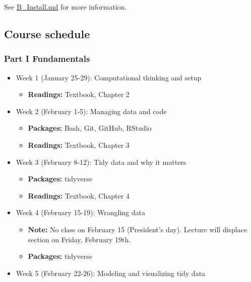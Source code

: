 \documentclass[
]{article}
\providecommand{\tightlist}{%
  \setlength{\itemsep}{0pt}\setlength{\parskip}{0pt}}
\begin{document}
See
\href{https://github.com/jaeyk/PS239T/blob/master/B_Install.md}{B\_Install.md}
for more information.

\hypertarget{course-schedule}{%
\subsection{Course schedule}\label{course-schedule}}

\hypertarget{part-i-fundamentals-1}{%
\subsubsection{Part I Fundamentals}\label{part-i-fundamentals-1}}

\begin{itemize}
\tightlist
\item
  Week 1 (January 25-29): Computational thinking and setup

  \begin{itemize}
  \tightlist
  \item
    \textbf{Readings:} Textbook, Chapter 2
  \end{itemize}
\item
  Week 2 (February 1-5): Managing data and code

  \begin{itemize}
  \tightlist
  \item
    \textbf{Packages:} Bash, Git, GitHub, RStudio
  \item
    \textbf{Readings:} Textbook, Chapter 3
  \end{itemize}
\item
  Week 3 (February 8-12): Tidy data and why it matters

  \begin{itemize}
  \tightlist
  \item
    \textbf{Packages:} tidyverse
  \item
    \textbf{Readings:} Textbook, Chapter 4
  \end{itemize}
\item
  Week 4 (February 15-19): Wrangling data

  \begin{itemize}
  \tightlist
  \item
    \textbf{Note:} No class on February 15 (President's day). Lecture
    will displace section on Friday, February 19th.
  \item
    \textbf{Packages:} tidyverse
  \end{itemize}
\item
  Week 5 (February 22-26): Modeling and visualizing tidy data


\end{itemize}
\end{document}

